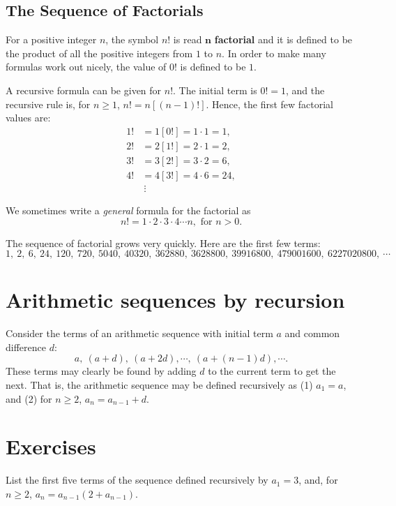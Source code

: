 \subsection{The Sequence of Factorials}
For a positive integer $n$,  the symbol  $n!$ is 
read $\mathbf{n}$ \textbf{factorial} and it is defined to be the product of
all the positive integers from $1$ to $n$. In order to make many
formulas work out nicely, the value of $0!$ is defined to be $1$.

A  recursive formula can be given for $n!$. The initial term is
$0!=1$, and the recursive rule is, for $n\geq 1$, $n! = n[ (n-1)!]$.
Hence, the first few factorial values are:
\begin{align*}
 1! &= 1[0!] = 1\cdot 1  = 1, \\
 2! &= 2[1!] = 2\cdot 1 = 2, \\ 
 3! &= 3[2!] = 3\cdot 2 = 6,  \\
 4! &= 4[3!] = 4\cdot 6 = 24, \\
    &\phantom{~}\vdots
\end{align*}

We sometimes write a {\itshape general} formula for the factorial as %
\[
n!=1\cdot2\cdot3\cdot4\cdots n, \text{ for $n>0$.}
\]

The sequence of factorial grows very quickly. Here are the first few terms:
\[
1,\ 2,\ 6,\ 24,\ 120,\ 720,\ 5040,\ 40320,\ 362880,\ 3628800,\ 39916800,\ 479001600,\
6227020800,\ \cdots
\]

\section{Arithmetic sequences by recursion}
Consider the terms of an arithmetic sequence with initial term $a$ and common difference
$d$:
\[
a,\  (a+d),\  (a+2d),\cdots,\ (a+(n-1)d),\cdots.
\]
These terms may clearly  be found by adding $d$ to the current term to get the next. That is,
the arithmetic sequence may be defined recursively as (1) $a_1=a$, and (2) for $n\geq 2$,
$a_n = a_{n-1}+d$.

\clearpage

\section{Exercises}

\begin{exer}
List the first five terms of the sequence defined recursively by
$a_{1} = 3$, and, for $n\geq 2$, $a_{n} = a_{n-1}(2+a_{n-1})$.
\end{exer}

